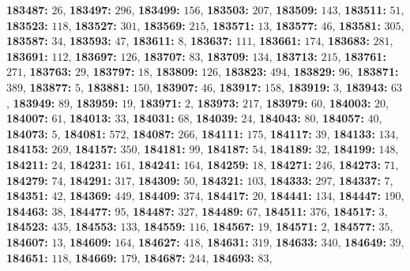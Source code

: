 \textsf{\bfseries 183487:} $26$, \textsf{\bfseries 183497:} $296$, \textsf{\bfseries 183499:} $156$, \textsf{\bfseries 183503:} $207$, \textsf{\bfseries 183509:} $143$, \textsf{\bfseries 183511:} $51$, \textsf{\bfseries 183523:} $118$, \textsf{\bfseries 183527:} $301$, \textsf{\bfseries 183569:} $215$, \textsf{\bfseries 183571:} $13$, \textsf{\bfseries 183577:} $46$, \textsf{\bfseries 183581:} $305$, \textsf{\bfseries 183587:} $34$, \textsf{\bfseries 183593:} $47$, \textsf{\bfseries 183611:} $8$, \textsf{\bfseries 183637:} $111$, \textsf{\bfseries 183661:} $174$, \textsf{\bfseries 183683:} $281$, \textsf{\bfseries 183691:} $112$, \textsf{\bfseries 183697:} $126$, \textsf{\bfseries 183707:} $83$, \textsf{\bfseries 183709:} $134$, \textsf{\bfseries 183713:} $215$, \textsf{\bfseries 183761:} $271$, \textsf{\bfseries 183763:} $29$, \textsf{\bfseries 183797:} $18$, \textsf{\bfseries 183809:} $126$, \textsf{\bfseries 183823:} $494$, \textsf{\bfseries 183829:} $96$, \textsf{\bfseries 183871:} $389$, \textsf{\bfseries 183877:} $5$, \textsf{\bfseries 183881:} $150$, \textsf{\bfseries 183907:} $46$, \textsf{\bfseries 183917:} $158$, \textsf{\bfseries 183919:} $3$, \textsf{\bfseries 183943:} $63$, \textsf{\bfseries 183949:} $89$, \textsf{\bfseries 183959:} $19$, \textsf{\bfseries 183971:} $2$, \textsf{\bfseries 183973:} $217$, \textsf{\bfseries 183979:} $60$, \textsf{\bfseries 184003:} $20$, \textsf{\bfseries 184007:} $61$, \textsf{\bfseries 184013:} $33$, \textsf{\bfseries 184031:} $68$, \textsf{\bfseries 184039:} $24$, \textsf{\bfseries 184043:} $80$, \textsf{\bfseries 184057:} $40$, \textsf{\bfseries 184073:} $5$, \textsf{\bfseries 184081:} $572$, \textsf{\bfseries 184087:} $266$, \textsf{\bfseries 184111:} $175$, \textsf{\bfseries 184117:} $39$, \textsf{\bfseries 184133:} $134$, \textsf{\bfseries 184153:} $269$, \textsf{\bfseries 184157:} $350$, \textsf{\bfseries 184181:} $99$, \textsf{\bfseries 184187:} $54$, \textsf{\bfseries 184189:} $32$, \textsf{\bfseries 184199:} $148$, \textsf{\bfseries 184211:} $24$, \textsf{\bfseries 184231:} $161$, \textsf{\bfseries 184241:} $164$, \textsf{\bfseries 184259:} $18$, \textsf{\bfseries 184271:} $246$, \textsf{\bfseries 184273:} $71$, \textsf{\bfseries 184279:} $74$, \textsf{\bfseries 184291:} $317$, \textsf{\bfseries 184309:} $50$, \textsf{\bfseries 184321:} $103$, \textsf{\bfseries 184333:} $297$, \textsf{\bfseries 184337:} $7$, \textsf{\bfseries 184351:} $42$, \textsf{\bfseries 184369:} $449$, \textsf{\bfseries 184409:} $374$, \textsf{\bfseries 184417:} $20$, \textsf{\bfseries 184441:} $134$, \textsf{\bfseries 184447:} $190$, \textsf{\bfseries 184463:} $38$, \textsf{\bfseries 184477:} $95$, \textsf{\bfseries 184487:} $327$, \textsf{\bfseries 184489:} $67$, \textsf{\bfseries 184511:} $376$, \textsf{\bfseries 184517:} $3$, \textsf{\bfseries 184523:} $435$, \textsf{\bfseries 184553:} $133$, \textsf{\bfseries 184559:} $116$, \textsf{\bfseries 184567:} $19$, \textsf{\bfseries 184571:} $2$, \textsf{\bfseries 184577:} $35$, \textsf{\bfseries 184607:} $13$, \textsf{\bfseries 184609:} $164$, \textsf{\bfseries 184627:} $418$, \textsf{\bfseries 184631:} $319$, \textsf{\bfseries 184633:} $340$, \textsf{\bfseries 184649:} $39$, \textsf{\bfseries 184651:} $118$, \textsf{\bfseries 184669:} $179$, \textsf{\bfseries 184687:} $244$, \textsf{\bfseries 184693:} $83$, 
